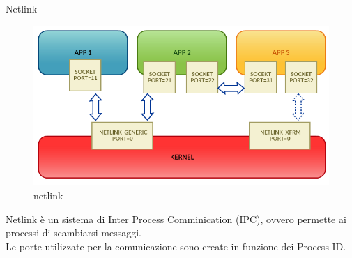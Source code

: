 \documentclass{beamer}
\begin{document}
\begin{frame}[fragile]{Netlink}
	\begin{figure}[t!]
	\includegraphics[scale=0.4]{img/netlink_comunication}
	\caption{netlink}
	\end{figure}
	\vspace{1em}
Netlink \`e un sistema di Inter Process Comminication (IPC), ovvero permette ai processi di scambiarsi messaggi.\\
Le porte utilizzate per la comunicazione sono create in funzione dei Process ID.\\
%

\end{frame}
\end{document}
